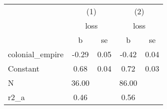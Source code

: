 {
\def\sym#1{\ifmmode^{#1}\else\(^{#1}\)\fi}
\begin{tabular}{l*{2}{cc}}
\hline\hline
                    &\multicolumn{2}{c}{(1)}  &\multicolumn{2}{c}{(2)}  \\
                    &\multicolumn{2}{c}{loss} &\multicolumn{2}{c}{loss} \\
                    &           b&          se&           b&          se\\
\hline
colonial\_empire     &       -0.29&        0.05&       -0.42&        0.04\\
Constant            &        0.68&        0.04&        0.72&        0.03\\
\hline
N                   &       36.00&            &       86.00&            \\
r2\_a                &        0.46&            &        0.56&            \\
\hline\hline
\end{tabular}
}
